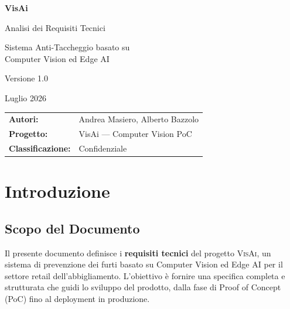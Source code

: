 \documentclass[a4paper, 12pt]{article}
\newcommand{\visai}{\textsc{VisAi}}
\begin{document}
\begin{titlepage}
    \centering
    \vspace*{3cm}
    {\Huge\bfseries\textcolor{visaidark}{VisAi}\par}
    \vspace{0.5cm}
    {\LARGE\textcolor{visaiblue}{Analisi dei Requisiti Tecnici}\par}
    \vspace{1cm}
    {\large Sistema Anti-Taccheggio basato su\\Computer Vision ed Edge AI\par}
    \vspace{2cm}
    {\large\textcolor{visaigray}{Versione 1.0}\par}
    \vspace{0.5cm}
    {\large\textcolor{visaigray}{Luglio 2026}\par}
    \vspace{3cm}
    \begin{tabular}{ll}
        \textbf{Autori:} & Andrea Masiero, Alberto Bazzolo \\
        \textbf{Progetto:} & VisAi — Computer Vision PoC \\
        \textbf{Classificazione:} & Confidenziale \\
    \end{tabular}
    \vfill
\end{titlepage}

\tableofcontents
\newpage

\section{Introduzione}

\subsection{Scopo del Documento}

Il presente documento definisce i \textbf{requisiti tecnici} del progetto \visai{}, un sistema di prevenzione dei furti basato su Computer Vision ed Edge AI per il settore retail dell'abbigliamento. L'obiettivo è fornire una specifica completa e strutturata che guidi lo sviluppo del prodotto, dalla fase di Proof of Concept (PoC) fino al deployment in produzione.
\end{document}
